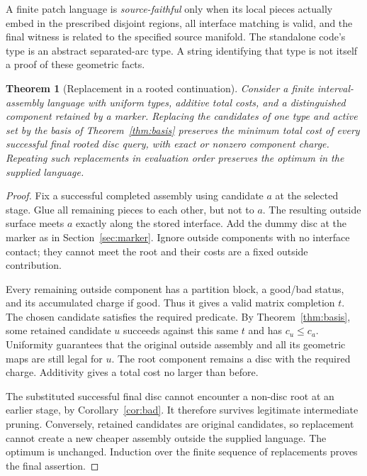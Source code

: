 \documentclass[11pt,letterpaper]{article}
\newtheorem{theorem}{Theorem}[section]
\theoremstyle{definition}
\begin{document}
A finite patch language is \emph{source-faithful} only when its local pieces actually embed in the prescribed disjoint regions, all interface matching is valid, and the final witness is related to the specified source manifold. The standalone code's type is an abstract separated-arc type. A string identifying that type is not itself a proof of these geometric facts.

\begin{theorem}[Replacement in a rooted continuation]\label{thm:context}
Consider a finite interval-assembly language with uniform types, additive total costs, and a distinguished component retained by a marker. Replacing the candidates of one type and active set by the basis of Theorem~\ref{thm:basis} preserves the minimum total cost of every successful final rooted disc query, with exact or nonzero component charge. Repeating such replacements in evaluation order preserves the optimum in the supplied language.
\end{theorem}
\begin{proof}
Fix a successful completed assembly using candidate $a$ at the selected stage. Glue all remaining pieces to each other, but not to $a$. The resulting outside surface meets $a$ exactly along the stored interface. Add the dummy disc at the marker as in Section~\ref{sec:marker}. Ignore outside components with no interface contact; they cannot meet the root and their costs are a fixed outside contribution.

Every remaining outside component has a partition block, a good/bad status, and its accumulated charge if good. Thus it gives a valid matrix completion $t$. The chosen candidate satisfies the required predicate. By Theorem~\ref{thm:basis}, some retained candidate $u$ succeeds against this same $t$ and has $c_u\leq c_a$. Uniformity guarantees that the original outside assembly and all its geometric maps are still legal for $u$. The root component remains a disc with the required charge. Additivity gives a total cost no larger than before.

The substituted successful final disc cannot encounter a non-disc root at an earlier stage, by Corollary~\ref{cor:bad}. It therefore survives legitimate intermediate pruning. Conversely, retained candidates are original candidates, so replacement cannot create a new cheaper assembly outside the supplied language. The optimum is unchanged. Induction over the finite sequence of replacements proves the final assertion.
\end{proof}
\end{document}
